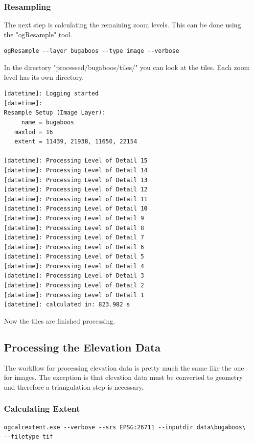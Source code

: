 \documentclass[
	12pt,
	a4paper,
	english,	
	appendixprefix,				     			        
	openany,		     	
	abstracton,		    		    
 	BCOR8mm,		    
]{scrartcl}
\begin{document}
\subsubsection{Resampling}

The next step is calculating the remaining zoom levels. This can be done using the "ogResample" tool.

\begin{lstlisting}
ogResample --layer bugaboos --type image --verbose
\end{lstlisting}

In the directory "processed/bugaboos/tiles/" you can look at the tiles. Each zoom level has its own directory.

\begin{lstlisting}
[datetime]: Logging started
[datetime]:
Resample Setup (Image Layer):
     name = bugaboos
   maxlod = 16
   extent = 11439, 21938, 11650, 22154

[datetime]: Processing Level of Detail 15
[datetime]: Processing Level of Detail 14
[datetime]: Processing Level of Detail 13
[datetime]: Processing Level of Detail 12
[datetime]: Processing Level of Detail 11
[datetime]: Processing Level of Detail 10
[datetime]: Processing Level of Detail 9
[datetime]: Processing Level of Detail 8
[datetime]: Processing Level of Detail 7
[datetime]: Processing Level of Detail 6
[datetime]: Processing Level of Detail 5
[datetime]: Processing Level of Detail 4
[datetime]: Processing Level of Detail 3
[datetime]: Processing Level of Detail 2
[datetime]: Processing Level of Detail 1
[datetime]: calculated in: 823.982 s
\end{lstlisting}

Now the tiles are finished processing.

\subsection{Processing the Elevation Data}

The workflow for processing elevation data is pretty much the same like the one for images. The exception is that elevation data must be converted to geometry and therefore a triangulation step is necessary.


\subsubsection{Calculating Extent}

\begin{lstlisting}
ogcalcextent.exe --verbose --srs EPSG:26711 --inputdir data\bugaboos\ --filetype tif
\end{lstlisting}
\end{document}
